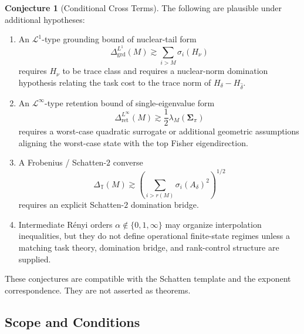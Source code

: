 \documentclass[12pt]{article}
\theoremstyle{definition}
\newtheorem{conjecture}[theorem]{Conjecture}
\begin{document}
\begin{conjecture}[Conditional Cross Terms]
\label{conj:cross-terms}
The following are plausible under additional hypotheses:
\begin{enumerate}[label=(\arabic*),leftmargin=2.0em]
\item An $\mathcal L^1$-type grounding bound of nuclear-tail form
\[
\Delta_{\mathrm{grd}}^{L^1}(M)
\gtrsim
\sum_{i>M}
\sigma_i(H_\nu)
\]
requires $H_\nu$ to be trace class and requires a nuclear-norm
domination hypothesis relating the task cost to the trace norm of
$H_\delta-H_{\widehat\delta}$.

\item An $\mathcal L^\infty$-type retention bound of single-eigenvalue form
\[
\Delta_{\mathrm{ret}}^{L^\infty}(M)
\gtrsim
\frac12
\lambda_M(\bm{\Sigma}_\pi)
\]
requires a worst-case quadratic surrogate or additional geometric
assumptions aligning the worst-case state with the top Fisher
eigendirection.

\item A Frobenius / Schatten-$2$ converse
\[
\Delta_{\mathbb T}(M)
\gtrsim
\left(
\sum_{i>r(M)}
\sigma_i(A_\delta)^2
\right)^{1/2}
\]
requires an explicit Schatten-$2$ domination bridge.

\item Intermediate R\'enyi orders $\alpha\notin\{0,1,\infty\}$ may organize
interpolation inequalities, but they do not define operational
finite-state regimes unless a matching task theory, domination bridge,
and rank-control structure are supplied.
\end{enumerate}
\end{conjecture}

These conjectures are compatible with the Schatten template and the exponent
correspondence.  They are not asserted as theorems.

\subsection{Scope and Conditions}
\label{subsec:spectral-scope}
\end{document}

